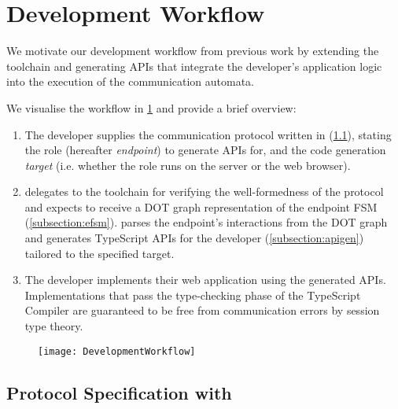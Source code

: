 \section{Development Workflow}

We motivate our development workflow from previous work 
\cite{PureScript2019} by extending the  toolchain
and generating APIs that integrate the developer's 
application logic
into the execution of the communication automata.

We visualise the workflow in \cref{fig:devworkflow} 
and provide a brief overview:

\begin{enumerate}

\item The developer supplies the communication protocol written in
 (\cref{subsection:scribble}), 
stating the role (hereafter \textit{endpoint})
to generate APIs for,
and the code generation \textit{target} 
(i.e. whether the role runs on the server or the web browser).

\item {} delegates to the 
 toolchain for verifying the well-formedness of
the protocol and expects to receive a DOT graph representation of
the endpoint FSM (\cref{subsection:efsm}). 
 parses the endpoint's 
interactions from the DOT graph and generates TypeScript APIs
for the developer (\cref{subsection:apigen}) 
tailored to the specified target.

\item The developer implements their web application using the
generated APIs. Implementations that pass the type-checking phase
of the TypeScript Compiler are guaranteed to be free from 
communication errors by session type theory.

\end{enumerate}

\begin{figure}[!ht]
\centering
\texttt{[image: DevelopmentWorkflow]}
\label{fig:devworkflow}
\end{figure}

\subsection{Protocol Specification with }
\label{subsection:scribble}

